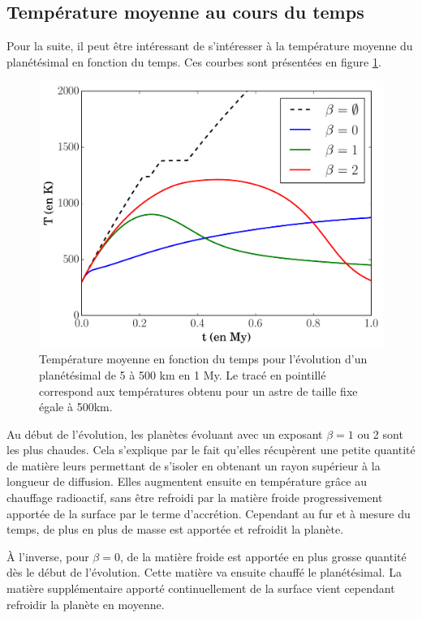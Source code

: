 \documentclass[10pt,a4paper]{article}
\numberwithin{equation}{section}
\begin{document}
\subsection{Température moyenne au cours du temps}

Pour la suite, il peut être intéressant de s'intéresser à la température moyenne du planétésimal en fonction du temps. Ces courbes sont présentées en figure \ref{tempMoyacre}.

\begin{figure}[h]
    \centering	    
	\includegraphics[scale=0.45]{figures/tempMoy_acretion.pdf}
    \caption{Température moyenne en fonction du temps pour l'évolution d'un planétésimal de 5 à 500 km en 1 My. Le tracé en pointillé correspond aux températures obtenu pour un astre de taille fixe égale à 500km.} 
    \label{tempMoyacre}
\end{figure}

Au début de l'évolution, les planètes évoluant avec un exposant $\beta= 1$ ou 2 sont les plus chaudes. Cela s'explique par le fait qu'elles récupèrent une petite quantité de matière leurs permettant de s'isoler en obtenant un rayon supérieur à la longueur de diffusion. Elles augmentent ensuite en température grâce au chauffage radioactif, sans être refroidi par la matière froide progressivement apportée de la surface par le terme d'accrétion. Cependant au fur et à mesure du temps, de plus en plus de masse est apportée et refroidit la planète.
\medskip

À l'inverse, pour $\beta = 0$, de la matière froide est apportée en plus grosse quantité dès le début de l'évolution. Cette matière va ensuite chauffé le planétésimal. La matière supplémentaire apporté continuellement de la surface vient cependant refroidir la planète en moyenne.
\end{document}
